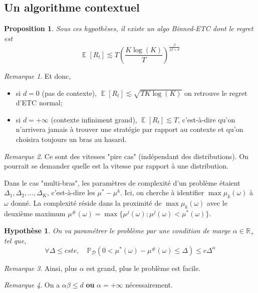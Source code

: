 \documentclass{article}
\DeclareMathOperator*{\E}{\mathbb{E}}
\newtheorem{proposition}{Proposition}[section]
\newtheorem{hypothesis}{Hypothèse}[section]
\theoremstyle{remark}
\theoremstyle{remark}
\newtheorem{remark}{Remarque}[section]
\begin{document}
\subsection{Un algorithme contextuel}

\begin{proposition}
   Sous ces hypothèses, il existe un algo Binned-ETC dont le regret est
   $$
      \E[R_t] \lesssim T \left(\frac{K \log(K)}{T}\right)^\frac{\beta}{2 \beta + d}
   $$
   \label{prop:binned_etc_regret}
\end{proposition}

\begin{remark}
   Et donc,
   \begin{itemize}
      \item si $d = 0$ (pas de contexte), $\E[R_t] \lesssim \sqrt{T K \log(K)}$ on retrouve le regret d'ETC normal;
      \item si $d = +\infty$ (contexte infiniment grand), $\E[R_t] \lesssim T$, c'est-à-dire qu'on n'arrivera jamais à trouver une stratégie par rapport au contexte et qu'on choisira toujours un bras au hasard.
   \end{itemize}
\end{remark}

\begin{remark}
   Ce sont des vitesses "pire cas" (indépendant des distributions). On pourrait se demander quelle est la vitesse par rapport à une distribution.
\end{remark}

Dans le cas "multi-bras", les paramètres de complexité d'un problème étaient $\Delta_1, \Delta_2, ..., \Delta_K$, c'est-à-dire les $\mu^* - \mu^k$. Ici, on cherche à identifier $\max \mu_k(\omega)$ à $\omega$ donné. La complexité réside dans la proximité de $\max \mu_k(\omega)$ avec le deuxième maximum $\mu^\#(\omega) = \max \{ \mu^j(\omega) ; \mu^j(\omega) < \mu^*(\omega )\}$.

\begin{hypothesis}
   On va paramétrer le problème par une condition de marge $\alpha \in \mathbb{R}_+$ tel que,
   $$
   \forall \Delta \leq cste, \quad \mathbb{P}_{\mathcal{D}}(0 < \mu^*(\omega) - \mu^\#(\omega) \leq \Delta) \leq c \Delta^\alpha
   $$

\end{hypothesis}

\begin{remark}
   Ainsi, plus $\alpha$ est grand, plus le problème est facile.
\end{remark}
\begin{remark}
   On a $\alpha \beta \leq d$ \textbf{ou} $\alpha = + \infty$ nécessairement.
\end{remark}
\end{document}
